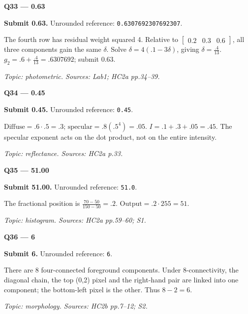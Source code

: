 \documentclass[11pt,a4paper]{article}
\begin{document}
\begin{minipage}{\linewidth}
\textbf{Q33 — 0.63}\par\smallskip
\textbf{Submit 0.63.} Unrounded reference: \texttt{0.6307692307692307}.\par
The fourth row has residual weight squared 4. Relative to \(\begin{bmatrix}0.2&0.3&0.6\end{bmatrix}\),\allowbreak{} all three components gain the same \(\delta\). Solve \(\delta=4(.1-3\delta)\),\allowbreak{} giving \(\delta=\frac{.4}{13}\). \(g_2=.6+\frac{.4}{13}=.6307692\); submit 0.63.\par
{\small\itshape Topic: photometric. Sources: Lab1; HC2a pp.34–39.}

\end{minipage}
\par\vspace{12pt}
\begin{minipage}{\linewidth}
\textbf{Q34 — 0.45}\par\smallskip
\textbf{Submit 0.45.} Unrounded reference: \texttt{0.45}.\par
\(\text{Diffuse}=.6\cdot.5=.3\); \(\text{specular}=.8(.5^4)=.05\). \(I=.1+.3+.05=.45\). The specular exponent acts on the dot product,\allowbreak{} not on the entire intensity.\par
{\small\itshape Topic: reflectance. Sources: HC2a p.33.}

\end{minipage}
\par\vspace{12pt}
\begin{minipage}{\linewidth}
\textbf{Q35 — 51.00}\par\smallskip
\textbf{Submit 51.00.} Unrounded reference: \texttt{51.0}.\par
The fractional position is \(\frac{70-50}{150-50}=.2\). \(\text{Output}=.2\cdot255=51\).\par
{\small\itshape Topic: histogram. Sources: HC2a pp.59–60; S1.}

\end{minipage}
\par\vspace{12pt}
\begin{minipage}{\linewidth}
\textbf{Q36 — 6}\par\smallskip
\textbf{Submit 6.} Unrounded reference: \texttt{6}.\par
There are 8 four-connected foreground components. Under 8-connectivity,\allowbreak{} the diagonal chain,\allowbreak{} the top (0,\allowbreak{}2) pixel and the right-hand pair are linked into one component; the bottom-left pixel is the other. Thus \(8-2=6\).\par
{\small\itshape Topic: morphology. Sources: HC2b pp.7–12; S2.}

\end{minipage}
\end{document}

